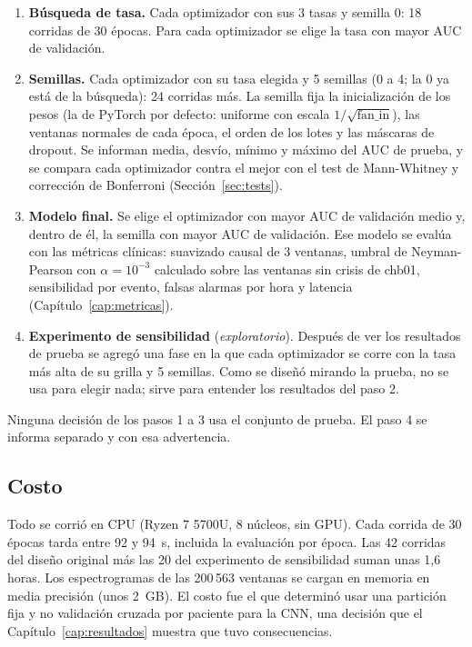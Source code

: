 \begin{enumerate}
  \item \textbf{Búsqueda de tasa.} Cada optimizador con sus 3 tasas y semilla 0: 18 corridas de 30 épocas. Para cada
        optimizador se elige la tasa con mayor AUC de validación.
  \item \textbf{Semillas.} Cada optimizador con su tasa elegida y 5 semillas (0 a 4; la 0 ya está de la búsqueda): 24
        corridas más. La semilla fija la inicialización de los pesos (la de PyTorch por defecto: uniforme con escala
        $1/\sqrt{\text{fan\_in}}$), las ventanas normales de cada época, el orden de los lotes y las máscaras de dropout. Se
        informan media, desvío, mínimo y máximo del AUC de prueba, y se compara cada optimizador contra el mejor con el test
        de Mann-Whitney y corrección de Bonferroni (Sección~\ref{sec:tests}).
  \item \textbf{Modelo final.} Se elige el optimizador con mayor AUC de validación medio y, dentro de él, la semilla con mayor
        AUC de validación. Ese modelo se evalúa con las métricas clínicas: suavizado causal de 3 ventanas, umbral de
        Neyman-Pearson con $\alpha = 10^{-3}$ calculado sobre las ventanas sin crisis de chb01, sensibilidad por evento,
        falsas alarmas por hora y latencia (Capítulo~\ref{cap:metricas}).
  \item \textbf{Experimento de sensibilidad} (\emph{exploratorio}). Después de ver los resultados de prueba se agregó una
        fase en la que cada optimizador se corre con la tasa más alta de su grilla y 5 semillas. Como se diseñó mirando la
        prueba, no se usa para elegir nada; sirve para entender los resultados del paso 2.
\end{enumerate}

Ninguna decisión de los pasos 1 a 3 usa el conjunto de prueba. El paso 4 se informa separado y con esa advertencia.

\subsection{Costo}

Todo se corrió en CPU (Ryzen 7 5700U, 8 núcleos, sin GPU). Cada corrida de 30 épocas tarda entre 92 y 94~s, incluida la
evaluación por época. Las 42 corridas del diseño original más las 20 del experimento de sensibilidad suman unas
1,6 horas. Los espectrogramas de las 200\,563 ventanas se cargan en memoria en media precisión (unos 2~GB). El costo
fue el que determinó usar una partición fija y no validación cruzada por paciente para la CNN, una decisión que el
Capítulo~\ref{cap:resultados} muestra que tuvo consecuencias.
